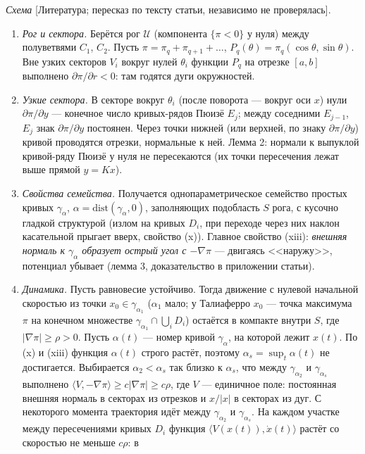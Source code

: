 \documentclass[11pt,a4paper]{article}
\theoremstyle{definition}
\newcommand{\mk}[1]{\textsf{[#1]}}
\begin{document}
\emph{Схема} \mk{Литература; пересказ по тексту статьи, независимо не проверялась}.
\begin{enumerate}[leftmargin=*]
\item \emph{Рог и сектора.} Берётся рог $\mathcal U$ (компонента $\{\pi<0\}$ у нуля) между полуветвями
$C_1$, $C_2$. Пусть $\pi=\pi_q+\pi_{q+1}+\dots$, $P_q(\theta)=\pi_q(\cos\theta,\sin\theta)$. Вне узких секторов $V_i$
вокруг нулей $\theta_i$ функции $P_q$ на отрезке $[a,b]$ выполнено $\partial\pi/\partial r<0$: там годятся дуги
окружностей.
\item \emph{Узкие сектора.} В секторе вокруг $\theta_i$ (после поворота --- вокруг оси $x$) нули
$\partial\pi/\partial y$ --- конечное число кривых-рядов Пюизё $E_j$; между соседними $E_{j-1}$, $E_j$ знак
$\partial\pi/\partial y$ постоянен. Через точки нижней (или верхней, по знаку $\partial\pi/\partial y$) кривой проводятся
отрезки, нормальные к ней. Лемма 2: нормали к выпуклой кривой-ряду Пюизё у нуля не
пересекаются (их точки пересечения лежат выше прямой $y=Kx$).
\item \emph{Свойства семейства.} Получается однопараметрическое семейство простых кривых
$\gamma_\alpha$, $\alpha=\mathrm{dist}(\gamma_\alpha,0)$, заполняющих подобласть $S$ рога, с кусочно гладкой структурой
(излом на кривых $D_i$, при переходе через них наклон касательной прыгает вверх, свойство (x)).
Главное свойство (xiii): \emph{внешняя нормаль к $\gamma_\alpha$ образует острый угол с $-\nabla\pi$} ---
двигаясь <<наружу>>, потенциал убывает (лемма 3, доказательство в приложении статьи).
\item \emph{Динамика.} Пусть равновесие устойчиво. Тогда движение с нулевой начальной скоростью из
точки $x_0\in\gamma_{\alpha_1}$ ($\alpha_1$ мало; у Талиаферро $x_0$ --- точка максимума $\pi$ на конечном
множестве $\gamma_{\alpha_1}\cap\bigcup_iD_i$) остаётся в компакте внутри $S$, где $|\nabla\pi|\ge\rho>0$. Пусть
$\alpha(t)$ --- номер кривой $\gamma_\alpha$, на которой лежит $x(t)$. По (x) и (xiii) функция $\alpha(t)$ строго
растёт, поэтому $\alpha_s=\sup_t\alpha(t)$ не достигается. Выбирается $\alpha_2<\alpha_s$ так близко к $\alpha_s$,
что между $\gamma_{\alpha_2}$ и $\gamma_{\alpha_s}$ выполнено $\langle V,-\nabla\pi\rangle\ge c|\nabla\pi|\ge c\rho$, где $V$ ---
единичное поле: постоянная внешняя нормаль в секторах из отрезков и $x/|x|$ в секторах из дуг.
С некоторого момента траектория идёт между $\gamma_{\alpha_2}$ и $\gamma_{\alpha_s}$. На каждом участке между
пересечениями кривых $D_i$ функция $\langle V(x(t)),\dot x(t)\rangle$ растёт со скоростью не меньше $c\rho$: в

\end{enumerate}
\end{document}
